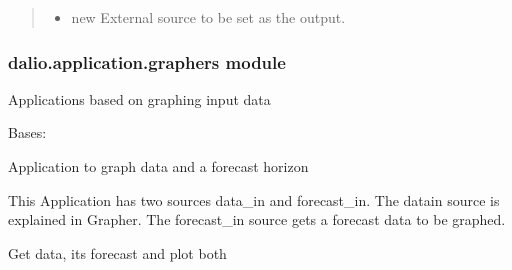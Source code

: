 \documentclass[letterpaper,10pt,english]{sphinxmanual}
\begin{document}
\begin{fulllineitems}
\begin{fulllineitems}
\begin{quote}
\begin{description}
\begin{itemize}
\item {} 
 \textendash{} new External source to be set as the output.

\end{itemize}

\end{description}\end{quote}

\end{fulllineitems}


\end{fulllineitems}



\subsubsection{dalio.application.graphers module}
\label{\detokenize{dalio.application:module-dalio.application.graphers}}\label{\detokenize{dalio.application:dalio-application-graphers-module}}
Applications based on graphing input data

\begin{fulllineitems}
\label{\detokenize{dalio.application:dalio.application.graphers.ForecastGrapher}}
Bases: {\hyperref[\detokenize{dalio.application:dalio.application.graphers.Grapher}]{}}

Application to graph data and a forecast horizon

This Application has two sources data\_in and forecast\_in. The data\sphinxhyphen{}in
source is explained in Grapher. The forecast\_in source gets a forecast
data to be graphed.

\begin{fulllineitems}
\label{\detokenize{dalio.application:dalio.application.graphers.ForecastGrapher.run}}
Get data, its forecast and plot both

\end{fulllineitems}


\end{fulllineitems}
\end{document}
